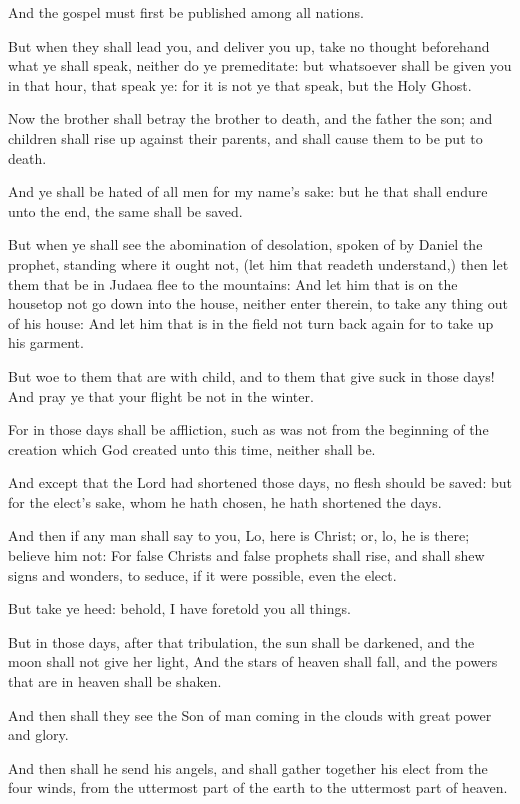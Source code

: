 \verse And the gospel must first be published among all nations.

\verse But when they shall lead you, and deliver you up, take no thought beforehand what ye shall speak, neither do ye premeditate: but whatsoever shall be given you in that hour, that speak ye: for it is not ye that speak, but the Holy Ghost.

\verse Now the brother shall betray the brother to death, and the father the son; and children shall rise up against their parents, and shall cause them to be put to death.

\verse And ye shall be hated of all men for my name's sake: but he that shall endure unto the end, the same shall be saved.

\verse But when ye shall see the abomination of desolation, spoken of by Daniel the prophet, standing where it ought not, (let him that readeth understand,) then let them that be in Judaea flee to the mountains: \verse And let him that is on the housetop not go down into the house, neither enter therein, to take any thing out of his house: \verse And let him that is in the field not turn back again for to take up his garment.

\verse But woe to them that are with child, and to them that give suck in those days!  \verse And pray ye that your flight be not in the winter.

\verse For in those days shall be affliction, such as was not from the beginning of the creation which God created unto this time, neither shall be.

\verse And except that the Lord had shortened those days, no flesh should be saved: but for the elect's sake, whom he hath chosen, he hath shortened the days.

\verse And then if any man shall say to you, Lo, here is Christ; or, lo, he is there; believe him not: \verse For false Christs and false prophets shall rise, and shall shew signs and wonders, to seduce, if it were possible, even the elect.

\verse But take ye heed: behold, I have foretold you all things.

\verse But in those days, after that tribulation, the sun shall be darkened, and the moon shall not give her light, \verse And the stars of heaven shall fall, and the powers that are in heaven shall be shaken.

\verse And then shall they see the Son of man coming in the clouds with great power and glory.

\verse And then shall he send his angels, and shall gather together his elect from the four winds, from the uttermost part of the earth to the uttermost part of heaven.

